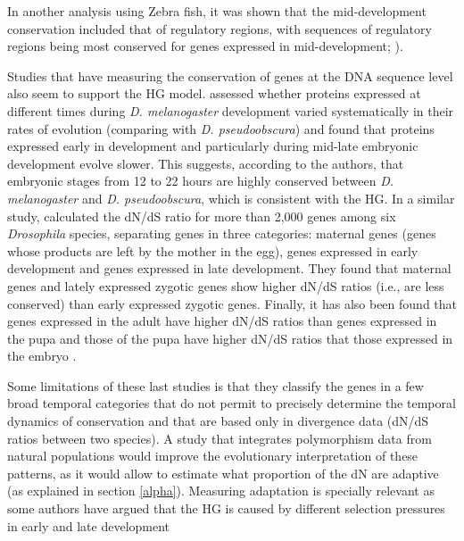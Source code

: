 In another analysis using Zebra fish, it was shown that the mid-development conservation included that of regulatory regions, with sequences of regulatory regions being most conserved for genes expressed in mid-development; \citealp{Piasecka2013}).

Studies that have measuring the conservation of genes at the DNA sequence level also seem to support the HG model.
\citet{Davis2005} assessed whether proteins expressed at different times during \textit{D.  melanogaster} development varied systematically in their rates of evolution (comparing with \textit{D. pseudoobscura}) and found that proteins expressed early in development and particularly during mid-late embryonic development evolve slower.  
This suggests, according to the authors, that embryonic stages from 12 to 22 hours are
highly conserved between \textit{D. melanogaster} and \textit{D. pseudoobscura}, which is consistent with the HG.
%
In a similar study, \citet{Mensch2013} calculated the dN/dS ratio for more than 2,000 genes among six \textit{Drosophila} species, separating genes in three categories: maternal genes (genes whose products are left by the mother in the egg), genes expressed in early development and genes expressed in late development. They found that maternal genes and lately expressed zygotic genes show higher dN/dS ratios (i.e., are less conserved) than early expressed zygotic genes.
Finally, it has also been found that genes expressed in the adult have higher dN/dS ratios than genes expressed in the pupa and those of the pupa have higher dN/dS ratios that those expressed in the embryo \citep{Artieri2009}.

Some limitations of these last studies is that they classify the genes in a few broad temporal categories that do not permit to precisely determine the temporal dynamics of conservation and that are based only in divergence data (dN/dS ratios between two species).
A study that integrates polymorphism data from natural populations would improve the evolutionary interpretation of these patterns, as it would allow to estimate what proportion of the dN are adaptive (as explained in section \ref{alpha}).
Measuring adaptation is specially relevant as some authors have argued that the HG is caused by different selection pressures in early and late development \citep{Slack1993,Kalinka2012,Wray2000}
